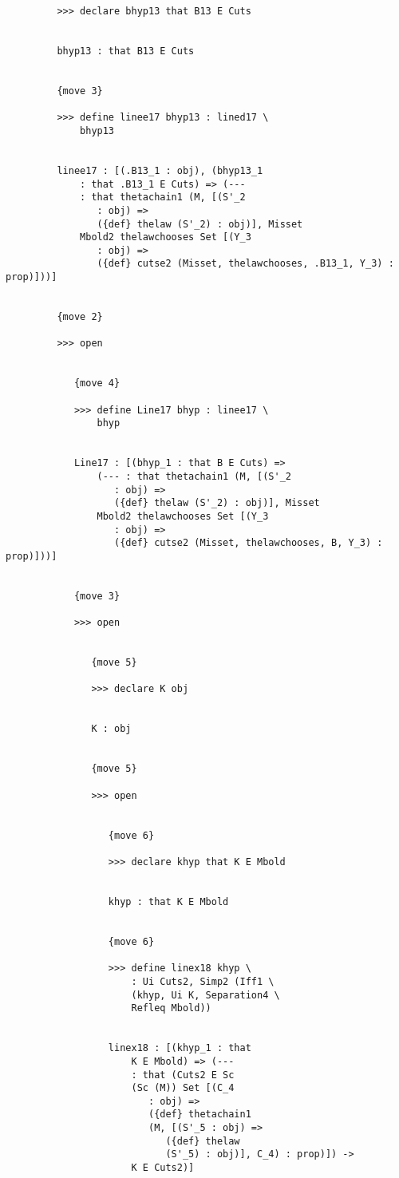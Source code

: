 \documentclass[12pt]{article}
\begin{document}
\begin{verbatim}
         >>> declare bhyp13 that B13 E Cuts


         bhyp13 : that B13 E Cuts


         {move 3}

         >>> define linee17 bhyp13 : lined17 \
             bhyp13


         linee17 : [(.B13_1 : obj), (bhyp13_1 
             : that .B13_1 E Cuts) => (--- 
             : that thetachain1 (M, [(S'_2 
                : obj) => 
                ({def} thelaw (S'_2) : obj)], Misset 
             Mbold2 thelawchooses Set [(Y_3 
                : obj) => 
                ({def} cutse2 (Misset, thelawchooses, .B13_1, Y_3) : prop)]))]


         {move 2}

         >>> open


            {move 4}

            >>> define Line17 bhyp : linee17 \
                bhyp


            Line17 : [(bhyp_1 : that B E Cuts) => 
                (--- : that thetachain1 (M, [(S'_2 
                   : obj) => 
                   ({def} thelaw (S'_2) : obj)], Misset 
                Mbold2 thelawchooses Set [(Y_3 
                   : obj) => 
                   ({def} cutse2 (Misset, thelawchooses, B, Y_3) : prop)]))]


            {move 3}

            >>> open


               {move 5}

               >>> declare K obj


               K : obj


               {move 5}

               >>> open


                  {move 6}

                  >>> declare khyp that K E Mbold


                  khyp : that K E Mbold


                  {move 6}

                  >>> define linex18 khyp \
                      : Ui Cuts2, Simp2 (Iff1 \
                      (khyp, Ui K, Separation4 \
                      Refleq Mbold))


                  linex18 : [(khyp_1 : that 
                      K E Mbold) => (--- 
                      : that (Cuts2 E Sc 
                      (Sc (M)) Set [(C_4 
                         : obj) => 
                         ({def} thetachain1 
                         (M, [(S'_5 : obj) => 
                            ({def} thelaw 
                            (S'_5) : obj)], C_4) : prop)]) -> 
                      K E Cuts2)]



\end{verbatim}
\end{document}
